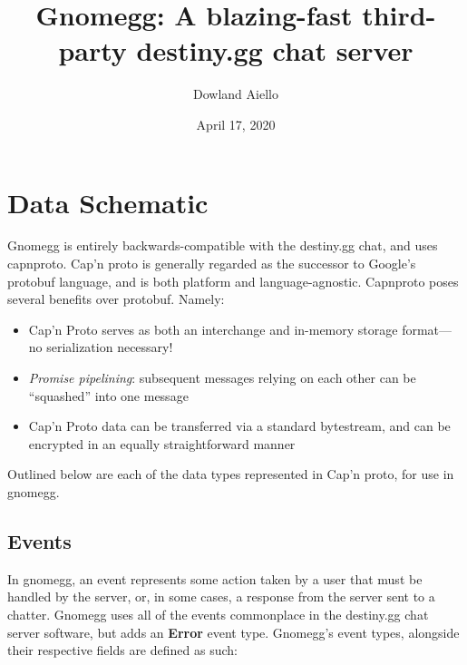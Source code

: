 \documentclass{article}
\begin{document}
\title{Gnomegg: A blazing-fast third-party destiny.gg chat server}
\author{Dowland Aiello}
\date{April 17, 2020}

\maketitle
\tableofcontents
\fancyhf{}

\newpage

\section{Data Schematic}

Gnomegg is entirely backwards-compatible with the destiny.gg chat, and uses
capnproto. Cap'n proto is generally regarded as the successor to Google's
protobuf language, and is both platform and language-agnostic. Capnproto poses
several benefits over protobuf. Namely:

\begin{itemize}
	\item Cap'n Proto serves as both an interchange and in-memory storage
		format---no serialization necessary!
	\item \emph{Promise pipelining}: subsequent messages relying on each other
		can be ``squashed'' into one message
	\item Cap'n Proto data can be transferred via a standard bytestream, and can
		be encrypted in an equally straightforward manner
\end{itemize}

Outlined below are each of the data types represented in Cap'n proto, for use
in gnomegg.

\subsection{Events}

In gnomegg, an event represents some action taken by a user that must be
handled by the server, or, in some cases, a response from the server sent to a
chatter. Gnomegg uses all of the events commonplace in the destiny.gg chat server
software, but adds an \textbf{Error} event type. Gnomegg's event types,
alongside their respective fields are defined as such:
\end{document}
